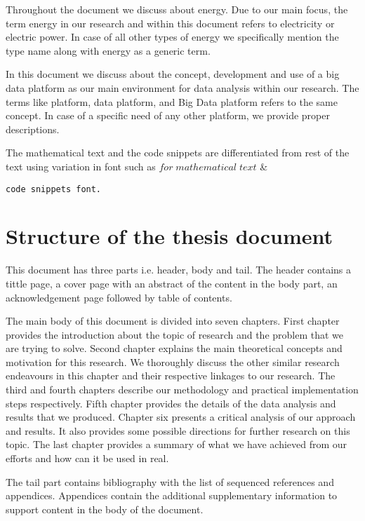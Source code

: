 Throughout the document we discuss about energy. Due to our main focus, the term energy in our research and within this document refers to electricity or electric power. In case of all other types of energy we specifically mention the type name along with energy as a generic term.

In this document we discuss about the concept, development and use of a big data platform as our main environment for data analysis within our research. The terms like platform, data platform, and Big Data platform refers to the same concept. In case of a specific need of any other platform, we provide proper descriptions.

The mathematical text and the code snippets are differentiated from rest of the text using variation in font such as \(for\; mathematical\;text\) \& \begin{lstlisting}
code snippets font. \end{lstlisting}


\section{Structure of the thesis document}
\label{section:structure} 
This document has three parts i.e. header, body and tail. The header contains a tittle page, a cover page with an abstract of the content in the body part, an acknowledgement page followed by table of contents.

The main body of this document is divided into seven chapters. First chapter provides the introduction about the topic of research and the problem that we are trying to solve. Second chapter explains the main theoretical concepts and motivation for this research. We thoroughly discuss the other similar research endeavours in this chapter and their respective linkages to our research. The third and fourth chapters describe our methodology and practical implementation steps respectively. Fifth chapter provides the details of the data analysis and results that we produced. Chapter six presents a critical analysis of our approach and  results. It also provides some possible directions for further research on this topic. The last chapter provides a summary of what we have achieved from our efforts and how can it be used in real.

The tail part contains bibliography with the list of sequenced references and appendices. Appendices contain the additional supplementary information to support content in the body of the document.  


